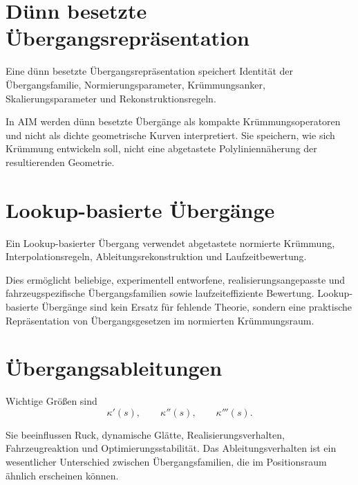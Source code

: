 \section{Dünn besetzte Übergangsrepräsentation}

\begin{definition}
\label{def:sparse-transition}
Eine dünn besetzte Übergangsrepräsentation speichert Identität der
Übergangsfamilie, Normierungsparameter, Krümmungsanker,
Skalierungsparameter und Rekonstruktionsregeln.
\end{definition}

In AIM werden dünn besetzte Übergänge als kompakte Krümmungsoperatoren und
nicht als dichte geometrische Kurven interpretiert. Sie speichern, wie sich
Krümmung entwickeln soll, nicht eine abgetastete Polyliniennäherung der
resultierenden Geometrie.

\section{Lookup-basierte Übergänge}

\begin{definition}
\label{def:lookup-based-transition}
Ein Lookup-basierter Übergang verwendet abgetastete normierte Krümmung,
Interpolationsregeln, Ableitungsrekonstruktion und Laufzeitbewertung.
\end{definition}

Dies ermöglicht beliebige, experimentell entworfene,
realisierungsangepasste und fahrzeugspezifische Übergangsfamilien sowie
laufzeiteffiziente Bewertung. Lookup-basierte Übergänge sind kein Ersatz für
fehlende Theorie, sondern eine praktische Repräsentation von
Übergangsgesetzen im normierten Krümmungsraum.

\section{Übergangsableitungen}

\begin{definition}[Übergangsableitungen]
\label{def:transition-derivatives}
Wichtige Größen sind
\[
\kappa'(s),\qquad \kappa''(s),\qquad \kappa'''(s).
\]
\end{definition}

Sie beeinflussen Ruck, dynamische Glätte, Realisierungsverhalten,
Fahrzeugreaktion und Optimierungsstabilität. Das Ableitungsverhalten ist ein
wesentlicher Unterschied zwischen Übergangsfamilien, die im Positionsraum
ähnlich erscheinen können.

